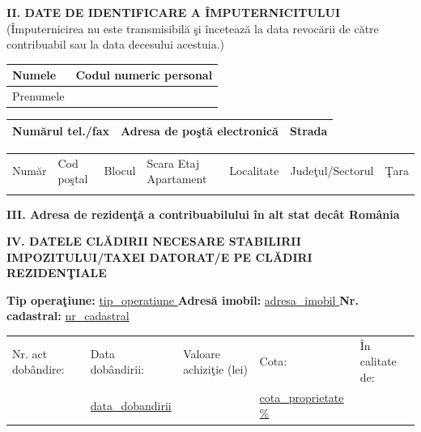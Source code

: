 \documentclass[8pt,a4paper,landscape]{extarticle}
\newcommand{\fillline}[1][6cm]{\underline{\hspace{#1}}}
\begin{document}
\vspace{0.15cm}

\textbf{II. DATE DE IDENTIFICARE A ÎMPUTERNICITULUI} \footnotesize (Împuternicirea nu este transmisibilă şi încetează la data revocării de către contribuabil sau la data decesului acestuia.) \normalsize

\begin{tabularx}{\textwidth}{|X|X|}
\hline
Numele \fillline[6cm] & Codul numeric personal \fillline[4cm] \\
\hline
Prenumele \fillline[6cm] & \\
\hline
\end{tabularx}

\begin{tabularx}{\textwidth}{|X|X|X|}
\hline
Numărul tel./fax \fillline[3cm] & Adresa de poştă electronică \fillline[4cm] & Strada \fillline[5cm] \\
\hline
\end{tabularx}

\begin{tabularx}{\textwidth}{|X|X|X|X|X|X|X|}
\hline
Număr & Cod poştal & Blocul & Scara \quad Etaj \quad Apartament & Localitate & Judeţul/Sectorul & Ţara \\
\fillline[1.5cm] & \fillline[2cm] & \fillline[1.5cm] & \fillline[3cm] & \fillline[3cm] & \fillline[3cm] & \fillline[2cm] \\
\hline
\end{tabularx}

\vspace{0.15cm}

\textbf{III. Adresa de reziden\c{t}ă a contribuabilului în alt stat decât România}\\
\fillline[18cm]

\vspace{0.15cm}

\textbf{IV. DATELE CLĂDIRII NECESARE STABILIRII IMPOZITULUI/TAXEI DATORAT/E PE CLĂDIRI REZIDENŢIALE}

\textbf{Tip operaţiune:} \underline{ {{tip_operatiune}} } \hspace{1cm} \textbf{Adresă imobil:} \underline{ {{adresa_imobil}} } \hspace{1cm} \textbf{Nr. cadastral:} \underline{ {{nr_cadastral}} }

\vspace{0.15cm}

\begin{tabularx}{\textwidth}{|X|X|X|X|X|}
\hline
Nr. act dobândire: & Data dobândirii: & Valoare achiziţie (lei) & Cota: & În calitate de: \\
\fillline[3cm] & \underline{ {{data_dobandirii}} } & \fillline[3cm] & \underline{ {{cota_proprietate}} \% } & \fillline[3cm] \\
\hline
\end{tabularx}
\end{document}
